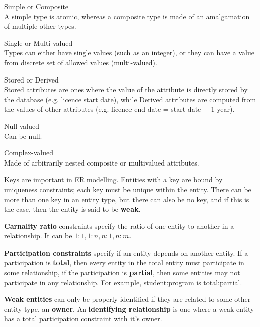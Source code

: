 \begin{description}
  \item Simple or Composite\\
    A simple type is atomic, whereas a composite type is made of an amalgamation
    of multiple other types.
  \item Single or Multi valued\\
    Types can either have single values (such as an integer), or they can have a
    value from discrete set of allowed values (multi-valued).
  \item Stored or Derived\\
    Stored attributes are ones where the value of the attribute is directly
    stored by the database (e.g. licence start date), while Derived attributes
    are computed from the values of other attributes (e.g. licence end date =
    start date + 1 year).
  \item Null valued\\
    Can be null.
  \item Complex-valued\\
    Made of arbitrarily nested composite or multivalued attributes.
\end{description}


Keys are important in ER modelling. Entities with a key are bound by uniqueness
constraints; each key must be unique within the entity. There can be more than
one key in an entity type, but there can also be no key, and if this is the
case, then the entity is said to be \textbf{weak}.

\textbf{Carnality ratio} constraints specify the ratio of one entity to
another in a relationship. It can be $1:1, 1:n, n:1, n:m$.

\textbf{Participation constraints} specify if an entity depends on another
entity. If a participation is \textbf{total}, then every entity in the total
entity must participate in some relationship, if the participation is
\textbf{partial}, then some entities may not participate in any relationship.
For example, student:program is total:partial.

\textbf{Weak entities} can only be properly identified if they are related to
some other entity type, an \textbf{owner}. An \textbf{identifying relationship}
is one where a weak entity has a total participation constraint with it's owner.

